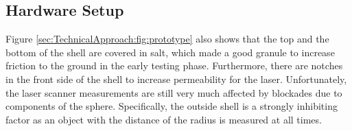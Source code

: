 \subsection{Hardware Setup}
\label{sec:TechnicalApproach:HardwareSetup}

Figure \ref{sec:TechnicalApproach:fig:prototype} also shows that the top and the bottom of the shell are covered in salt, which made a good granule to increase friction to the ground in the early testing phase. Furthermore, there are notches in the front side of the shell to increase permeability for the laser. Unfortunately, the laser scanner measurements are still very much affected by blockades due to components of the sphere. Specifically, the outside shell is a strongly inhibiting factor as an object with the distance of the radius is measured at all times.
                                                                                                                                                                                                                  
